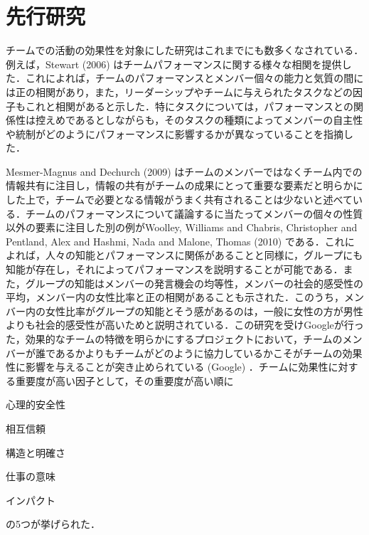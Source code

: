 \documentclass[a4paper, 11pt]{jsarticle}
\begin{document}
\section{先行研究}
チームでの活動の効果性を対象にした研究はこれまでにも数多くなされている．例えば，Stewart (2006) \cite{Stewart}はチームパフォーマンスに関する様々な相関を提供した．これによれば，チームのパフォーマンスとメンバー個々の能力と気質の間には正の相関があり，また，リーダーシップやチームに与えられたタスクなどの因子もこれと相関があると示した．特にタスクについては，パフォーマンスとの関係性は控えめであるとしながらも，そのタスクの種類によってメンバーの自主性や統制がどのようにパフォーマンスに影響するかが異なっていることを指摘した．

Mesmer-Magnus and Dechurch (2009) \cite{Mesmer}はチームのメンバーではなくチーム内での情報共有に注目し，情報の共有がチームの成果にとって重要な要素だと明らかにした上で，チームで必要となる情報がうまく共有されることは少ないと述べている．チームのパフォーマンスについて議論するに当たってメンバーの個々の性質以外の要素に注目した別の例がWoolley, Williams and Chabris, Christopher and Pentland, Alex and Hashmi, Nada and Malone, Thomas (2010) \cite{Woolley}である．これによれば，人々の知能とパフォーマンスに関係があることと同様に，グループにも知能が存在し，それによってパフォーマンスを説明することが可能である．また，グループの知能はメンバーの発言機会の均等性，メンバーの社会的感受性の平均，メンバー内の女性比率と正の相関があることも示された．このうち，メンバー内の女性比率がグループの知能とそう感があるのは，一般に女性の方が男性よりも社会的感受性が高いためと説明されている．この研究を受けGoogleが行った，効果的なチームの特徴を明らかにするプロジェクトにおいて，チームのメンバーが誰であるかよりもチームがどのように協力しているかこそがチームの効果性に影響を与えることが突き止められている (Google\cite{Google}) ．チームに効果性に対する重要度が高い因子として，その重要度が高い順に
\begin{inparaenum}[1)]
  \item 心理的安全性
  \item 相互信頼
  \item 構造と明確さ
  \item 仕事の意味
  \item インパクト
\end{inparaenum}
の5つが挙げられた．
\end{document}
